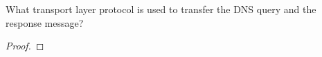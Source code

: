 \documentclass[../../main.tex]{subfiles}
\begin{document}
\begin{wts}
What transport layer protocol is used to transfer the DNS query and the response message? 
\end{wts}
\begin{proof}

\end{proof}
\end{document}
